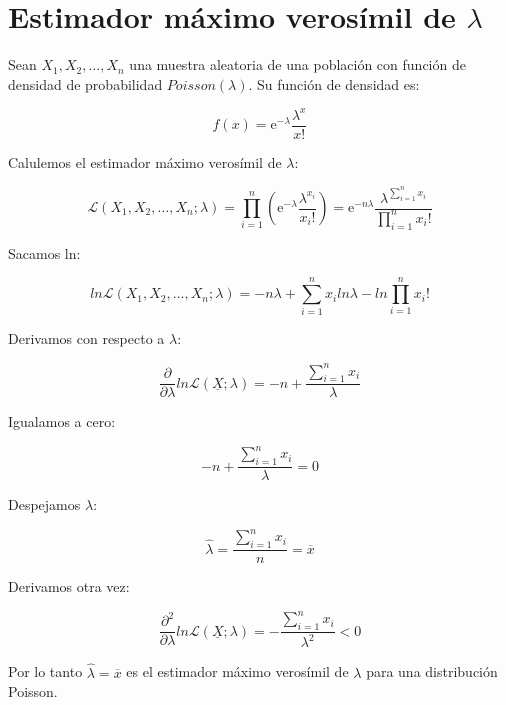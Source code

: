 %
\section{Estimador máximo verosímil de $\lambda$} \label{Apend_ResultadosUtiles}

Sean $X_{1}, X_{2}, \ldots, X_{n}$ una muestra aleatoria de una población con función de densidad de probabilidad $Poisson(\lambda)$. Su función de densidad es:

$$f(x) = \mathrm{e}^{-\lambda} \dfrac{\lambda^{x}}{x!}$$

Calulemos el estimador máximo verosímil de $\lambda$:

$$\mathcal{L}(X_{1}, X_{2},\ldots, X_{n}; \lambda) = \displaystyle \prod_{i = 1}^{n} \left( \mathrm{e}^{-\lambda} \dfrac{\lambda^{x_{i}}}{x_{i}!} \right) = \mathrm{e}^{-n \lambda} \dfrac{\lambda^{\displaystyle \sum_{i = 1}^{n} x_{i}}}{\displaystyle  \prod_{i = 1}^{n} x_{i}!}$$

Sacamos ln:

$$ln \mathcal{L}(X_{1}, X_{2}, \ldots, X_{n};\lambda) = -n\lambda + \displaystyle \sum_{i = 1}^{n} x_{i} ln \lambda - ln \displaystyle  \prod_{i = 1}^{n} x_{i}!$$

Derivamos con respecto a $\lambda$:

$$\dfrac{\partial}{\partial \lambda} ln \mathcal{L}(\underline{X};\lambda) = -n + \dfrac{\displaystyle \sum_{i = 1}^{n} x_{i}}{\lambda}$$

Igualamos a cero:

$$-n + \dfrac{\displaystyle \sum_{i = 1}^{n} x_{i}}{\lambda} = 0$$

Despejamos $\lambda$:

$$\hat{\lambda} = \dfrac{\displaystyle \sum_{i = 1}^{n} x_{i}}{n} = \overline{x}$$


Derivamos otra vez:

$$\dfrac{\partial^{2}}{\partial \lambda} ln \mathcal{L}(\underline{X};\lambda)  = - \dfrac{\displaystyle \sum_{i = 1}^{n} x_{i}}{\lambda^{2}} < 0$$


Por lo tanto $\hat{\lambda} = \overline{x}$ es el estimador máximo verosímil de $\lambda$ para una distribución Poisson.
